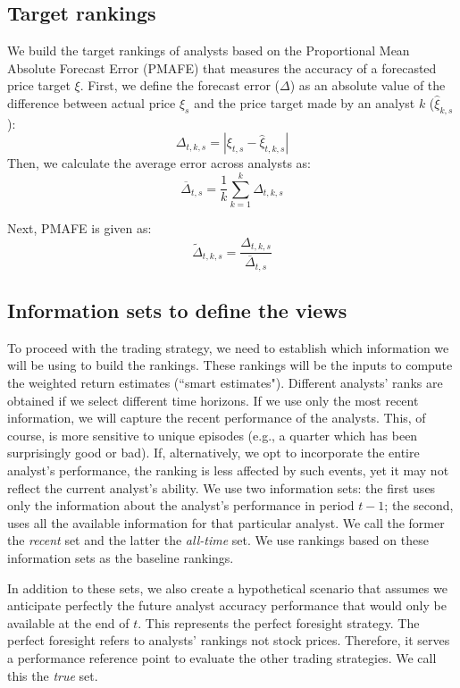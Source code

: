 \documentclass{llncs}\usepackage[]{graphicx}\usepackage[]{color}
\newcommand{\tr}{\textit{true}}
\newcommand{\naive}{\textit{recent}}
\newcommand{\default}{\textit{all-time}}
\begin{document}
\subsection{Target rankings}
We build the target rankings of analysts based on the Proportional  Mean Absolute Forecast Error (PMAFE) that measures the accuracy of a forecasted price target $\xi$. First,  we define the  forecast error  ($\Delta$) as an absolute value of the difference between actual price $\xi_s$ and the price target made by an analyst $k$ ($\hat{\xi}_{k,s}$):
\begin{equation}
\Delta_{t,k,s}=|\xi_{t,s}-\hat{\xi}_{t,k,s}|
\end{equation}
Then, we calculate the average error across analysts as:
\begin{equation}
\overline{\Delta}_{t,s}=\frac{1}{k}\sum_{k=1}^k \Delta_{t,k,s}
\end{equation}

Next, PMAFE is given as:
\begin{equation}
\tilde{\Delta}_{t,k,s}=\frac{\Delta_{t,k,s}}{\overline{\Delta}_{t,s}}
\end{equation}



\subsection{Information sets to define the views}
\label{inf-set}
To proceed with the trading strategy, we need to establish which information we  will be using to build the rankings. These rankings will be the inputs to compute the weighted return estimates (``smart estimates"). Different analysts' ranks are obtained  if we select different time horizons. If we use only the most  recent information, we will capture the recent performance of the analysts. This, of course, is more sensitive to unique episodes (e.g., a quarter which has been surprisingly good or bad). If, alternatively, we opt to incorporate the entire analyst's performance, the ranking is less affected by such events, yet it may not reflect the current analyst's ability. We use two information sets: the first uses only the  information about the analyst's performance in period $t-1$; the second, uses all the available  information for that particular analyst. We call the former the \naive{} set and the latter the \default{} set. We use rankings based on these information sets as the baseline rankings.

In addition to these sets,  we also create a hypothetical scenario that assumes we anticipate perfectly the future analyst accuracy performance  that would only be available at the end of $t$.  This represents the perfect foresight strategy. The perfect foresight refers to analysts' rankings not stock prices. Therefore, it serves a performance reference point to evaluate the other trading strategies. We call this the \tr{} set.
\end{document}
